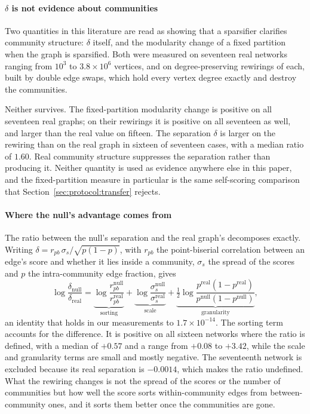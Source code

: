 \paragraph{$\delta$ is not evidence about communities}
Two quantities in this literature are read as showing that a sparsifier clarifies
community structure: $\delta$ itself, and the modularity change of a fixed
partition when the graph is sparsified. Both were measured on seventeen real
networks ranging from $10^3$ to $3.8 \times 10^6$ vertices, and on
degree-preserving rewirings of each, built by double edge swaps, which hold every
vertex degree exactly and destroy the communities.

Neither survives. The fixed-partition modularity change is positive on all
seventeen real graphs; on their rewirings it is positive on all seventeen as
well, and larger than the real value on fifteen. The separation $\delta$ is
larger on the rewiring than on the real graph in sixteen of seventeen cases, with
a median ratio of $1.60$. Real community structure suppresses the separation
rather than producing it. Neither quantity is used as evidence anywhere else in
this paper, and the fixed-partition measure in particular is the same
self-scoring comparison that Section~\ref{sec:protocol:transfer} rejects.

\paragraph{Where the null's advantage comes from}
The ratio between the null's separation and the real graph's decomposes exactly.
Writing $\delta = r_{pb}\, \sigma_s / \sqrt{p(1-p)}$, with $r_{pb}$ the
point-biserial correlation between an edge's score and whether it lies inside a
community, $\sigma_s$ the spread of the scores and $p$ the intra-community edge
fraction, gives
\begin{equation}\label{eq:delta-decomp}
\log \frac{\delta_{\mathrm{null}}}{\delta_{\mathrm{real}}}
= \underbrace{\log \frac{r_{pb}^{\mathrm{null}}}{r_{pb}^{\mathrm{real}}}}_{\text{sorting}}
+ \underbrace{\log \frac{\sigma_s^{\mathrm{null}}}{\sigma_s^{\mathrm{real}}}}_{\text{scale}}
+ \underbrace{\tfrac{1}{2}\log \frac{p^{\mathrm{real}}(1-p^{\mathrm{real}})}
{p^{\mathrm{null}}(1-p^{\mathrm{null}})}}_{\text{granularity}} ,
\end{equation}
an identity that holds in our measurements to $1.7 \times 10^{-14}$. The sorting
term accounts for the difference. It is positive on all sixteen networks where
the ratio is defined, with a median of $+0.57$ and a range from $+0.08$ to
$+3.42$, while the scale and granularity terms are small and mostly negative. The
seventeenth network is excluded because its real separation is $-0.0014$, which
makes the ratio undefined. What the rewiring changes is not the spread of the
scores or the number of communities but how well the score sorts within-community
edges from between-community ones, and it sorts them better once the communities
are gone.

